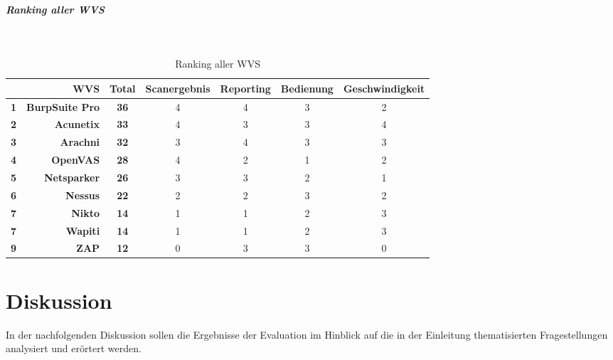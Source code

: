 \documentclass[12pt,oneside,a4paper,parskip,pointlessnumbers]{scrbook}
\begin{document}
     \paragraph{Ranking aller WVS}
     \
     \begin{table}[H]
  \begin{tabular}{|r|r|c|c|c|c|c|}
 \cline{2-7}
 \multicolumn{1}{l|}{} & \textbf{WVS}           & \textbf{Total} & Scanergebnis & Reporting & Bedienung & Geschwindigkeit  \\
 \hline
 \textbf{1}            & \textbf{BurpSuite Pro} & \textbf{36}     & 4            & 4         & 3         & 2                \\
 \hline
 \textbf{2}            & \textbf{Acunetix}      & \textbf{33}\footnotemark     & 4            & 3         & 3         & 4                \\
 \hline
 \textbf{3}            & \textbf{Arachni}       & \textbf{32}     & 3            & 4         & 3         & 3                \\
 \hline
 \textbf{4}            & \textbf{OpenVAS}       & \textbf{28}     & 4            & 2         & 1         & 2                \\
 \hline
 \textbf{5}            & \textbf{Netsparker}    & \textbf{26}     & 3            & 3         & 2         & 1                \\
 \hline
 \textbf{6}            & \textbf{Nessus}        & \textbf{22}     & 2            & 2         & 3         & 2                \\
 \hline
 \textbf{7}            & \textbf{Nikto}         & \textbf{14}     & 1            & 1         & 2         & 3                \\
 \hline
 \textbf{7}            & \textbf{Wapiti}        & \textbf{14}     & 1            & 1         & 2         & 3                \\
 \hline
 \textbf{9}            & \textbf{ZAP}           & \textbf{12}     & 0            & 3         & 3         & 0                \\
 \hline
 \end{tabular}
 \caption[Ranking aller WVS]{Ranking aller WVS}
 \end{table}

\chapter{Diskussion}
In der nachfolgenden Diskussion sollen die Ergebnisse der Evaluation im Hinblick auf die in der Einleitung thematisierten Fragestellungen analysiert und erörtert werden.
\end{document}

